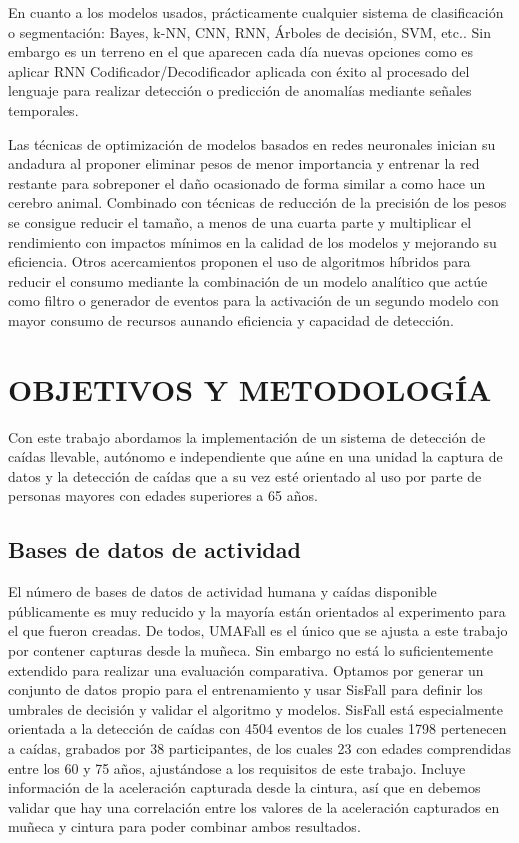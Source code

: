 \documentclass[11pt,a4paper,spanish,twocolumn]{article}
\begin{document}
En cuanto a los modelos usados, prácticamente cualquier sistema de clasificación o segmentación: Bayes, k-NN, CNN, RNN, Árboles de decisión, SVM, etc.\cite{Liu2018,Anita2020}. Sin embargo es un terreno en el que aparecen cada día nuevas opciones como es aplicar RNN Codificador/Decodificador aplicada con éxito al procesado del lenguaje\cite{Cho2014,Serban2017} para realizar detección o predicción de anomalías mediante señales temporales\cite{Park2018,Peng2018}. 

Las técnicas de optimización de modelos basados en redes neuronales inician su andadura al proponer eliminar pesos de menor importancia y entrenar la red restante para sobreponer el daño ocasionado\cite{RNN1986} de forma similar a como hace un cerebro animal. Combinado con técnicas de reducción de la precisión de los pesos se consigue reducir el tamaño, a menos de una cuarta parte y multiplicar el rendimiento con impactos mínimos en la calidad de los modelos y mejorando su eficiencia\cite{han2015,Guo2018,Jin2019}. Otros acercamientos proponen el uso de algoritmos híbridos para reducir el consumo mediante la combinación de un modelo analítico que actúe como filtro o generador de eventos para la activación de un segundo modelo con mayor consumo de recursos\cite{Lim2014, Putra2017} aunando eficiencia y capacidad de detección.

\section{OBJETIVOS Y METODOLOGÍA}
Con este trabajo abordamos la implementación de un sistema de detección de caídas llevable, autónomo e independiente que aúne en una unidad la captura de datos y la detección de caídas que a su vez esté orientado al uso por parte de personas mayores con edades superiores a 65 años.

\subsection{Bases de datos de actividad}
El número de bases de datos de actividad humana y caídas disponible públicamente es muy reducido \cite{igual2015} y la mayoría están orientados al experimento para el que fueron creadas. De todos,  UMAFall\cite{Edu/UMA/2017} es el único que se ajusta a este trabajo por contener capturas desde la muñeca. Sin embargo no está lo suficientemente extendido para realizar una evaluación comparativa. Optamos por generar un conjunto de datos propio para el entrenamiento y usar SisFall\cite{Sucerquia2017} para definir los umbrales de decisión y validar el algoritmo y modelos. SisFall está especialmente orientada a la detección de caídas con 4504 eventos de los cuales 1798 pertenecen a caídas, grabados por 38 participantes, de los cuales 23 con edades comprendidas entre los 60 y 75 años, ajustándose a los requisitos de este trabajo. Incluye información de la aceleración capturada desde la cintura, así que en debemos validar que hay una correlación entre los valores de la aceleración capturados en muñeca y cintura para poder combinar ambos resultados.
\end{document}
